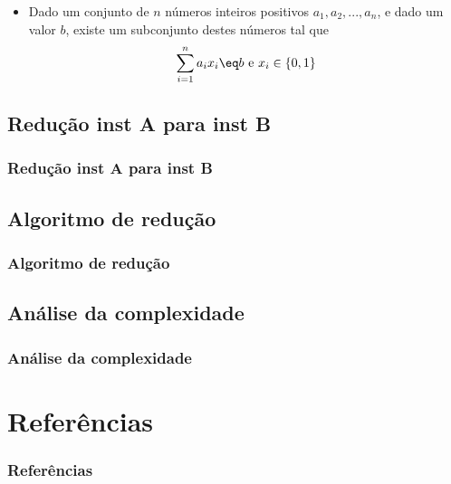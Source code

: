 \documentclass{beamer}
\begin{document}
\begin{frame}
    \begin{itemize}
        \item
            Dado um conjunto de $n$ números inteiros positivos $a_{1}, a_{2}, ..., a_{n}$, e dado um valor $b$, existe um subconjunto destes números tal que
             \begin{equation*}
                \sum_{i=1}^{n} a_{i} x_{i} \eq b \mbox{ e } x_{i} \in \{0,1\}
             \end{equation*}
	\end{itemize}

\end{frame}


\subsection{Redução inst A para inst B}
\begin{frame}
\frametitle{Redução inst A para inst B}
\end{frame}

\subsection{Algoritmo de redução}
\begin{frame}
\frametitle{Algoritmo de redução}
\end{frame}

\subsection{Análise da complexidade}
\begin{frame}
\frametitle{Análise da complexidade}
\end{frame}

\section{Referências}
\begin{frame}
\frametitle{Referências}
\end{frame}
\end{document}
